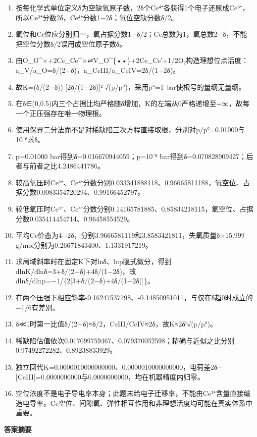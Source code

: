 \documentclass[UTF8,11pt,a4paper]{ctexart}
\begin{document}
\begin{enumerate}
\item 按每化学式单位定义δ为空缺氧原子数，2δ个Ce⁴⁺各获得1个电子还原成Ce³⁺，所以Ce³⁺分数2δ，Ce⁴⁺分数1−2δ；氧位空缺分数δ/2。
\item 氧位和Ce位应分别归一，氧占据分数1−δ/2；Ce总数为1，氧总数2−δ，不能把空位分数δ/2误用成空位原子数δ。
\item 由O\_O\textasciicircum{}×+2Ce\_Ce\textasciicircum{}×⇌V\_O\textasciicircum{}\{••\}+2Ce\_Ce′+1/2O₂构造理想位点活度：a\_V/a\_O=δ/(2−δ)，a\_CeIII/a\_CeIV=2δ/(1−2δ)。
\item 故K=(δ/(2−δ)) [2δ/(1−2δ)]² √(p/p°)，采用p°=1 bar使根号的量纲无量纲。
\item 在δ∈(0,0.5)内三个占据比均严格随δ增加，K的左端从0严格递增至+∞，故每一个正压强存在唯一物理根。
\item 使用保界二分法而不是对稀缺陷三次方程直接取根，分别对p/p°=0.01000与10⁻⁶求δ。
\item p=0.01000 bar得到δ=0.016670944059；p=10⁻⁶ bar得到δ=0.070828909427；后者与前者之比4.2486441786。
\item 较高氧压时Ce³⁺、Ce⁴⁺分数分别0.033341888118、0.96665811188，氧空位、占据分数0.0083354720294、0.99166452797。
\item 较低氧压时Ce³⁺、Ce⁴⁺分数分别0.14165781885、0.85834218115，氧空位、占据分数0.035414454714、0.96458554529。
\item 平均Ce价态为4−2δ，分别3.9666581119和3.8583421811，失氧质量δ×15.999 g/mol分别为0.26671843400、1.1331917219。
\item 求局域斜率时在固定K下对lnδ、lnp隐式微分，得到dlnK/dlnδ=3+δ/(2−δ)+4δ/(1−2δ)，故dlnδ/dlnp=−1/\{2[3+δ/(2−δ)+4δ/(1−2δ)]\}。
\item 在两个压强下相应斜率-0.16247537798、-0.14850951011，与仅在δ趋0时成立的−1/6有差别。
\item δ≪1时第一比值δ/(2−δ)≈δ/2，CeIII/CeIV≈2δ，故K≈2δ³√(p/p°)。
\item 稀缺陷估值依次0.017099759467、0.079370052598；精确与近似之比分别0.97492272282、0.89238833929。
\item 独立回代K=0.0000010000000000、0.0000010000000000，电荷差2δ−[CeIII]=0.0000000000与0.0000000000，均在机器精度内归零。
\item 空位浓度不是电子导电率本身；此题未给电子迁移率，不能由Ce³⁺含量直接编造电导率。Ce空位、间隙氧、弹性相互作用和非理想活度均可能在真实体系中重要。
\end{enumerate}
\noindent\textbf{答案摘要}\par
\end{document}
